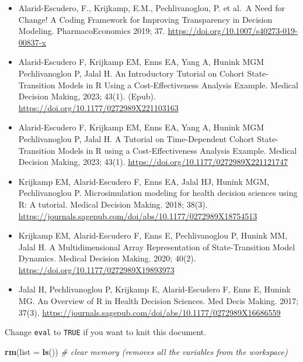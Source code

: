 \documentclass[
]{article}
\newenvironment{Shaded}{\begin{snugshade}}{\end{snugshade}}
\newcommand{\AttributeTok}[1]{\textcolor[rgb]{0.13,0.29,0.53}{#1}}
\newcommand{\CommentTok}[1]{\textcolor[rgb]{0.56,0.35,0.01}{\textit{#1}}}
\newcommand{\FunctionTok}[1]{\textcolor[rgb]{0.13,0.29,0.53}{\textbf{#1}}}
\newcommand{\NormalTok}[1]{#1}
\begin{document}
\begin{itemize}
\item
  Alarid-Escudero, F., Krijkamp, E.M., Pechlivanoglou, P. et al.~A Need
  for Change! A Coding Framework for Improving Transparency in Decision
  Modeling. PharmacoEconomics 2019; 37.
  \url{https://doi.org/10.1007/s40273-019-00837-x}
\item
  Alarid-Escudero F, Krijkamp EM, Enns EA, Yang A, Hunink MGM
  Pechlivanoglou P, Jalal H. An Introductory Tutorial on Cohort
  State-Transition Models in R Using a Cost-Effectiveness Analysis
  Example. Medical Decision Making, 2023; 43(1). (Epub).
  \url{https://doi.org/10.1177/0272989X221103163}
\item
  Alarid-Escudero F, Krijkamp EM, Enns EA, Yang A, Hunink MGM
  Pechlivanoglou P, Jalal H. A Tutorial on Time-Dependent Cohort
  State-Transition Models in R using a Cost-Effectiveness Analysis
  Example. Medical Decision Making, 2023; 43(1).
  \url{https://doi.org/10.1177/0272989X221121747}
\item
  Krijkamp EM, Alarid-Escudero F, Enns EA, Jalal HJ, Hunink MGM,
  Pechlivanoglou P. Microsimulation modeling for health decision
  sciences using R: A tutorial. Medical Decision Making. 2018; 38(3).
  \url{https://journals.sagepub.com/doi/abs/10.1177/0272989X18754513}
\item
  Krijkamp EM, Alarid-Escudero F, Enns E, Pechlivanoglou P, Hunink MM,
  Jalal H. A Multidimensional Array Representation of State-Transition
  Model Dynamics. Medical Decision Making. 2020; 40(2).
  \url{https://doi.org/10.1177/0272989X19893973}
\item
  Jalal H, Pechlivanoglou P, Krijkamp E, Alarid-Escudero F, Enns E,
  Hunink MG. An Overview of R in Health Decision Sciences. Med Decis
  Making. 2017; 37(3).
  \url{https://journals.sagepub.com/doi/abs/10.1177/0272989X16686559}
\end{itemize}

\newpage

Change \texttt{eval} to \texttt{TRUE} if you want to knit this document.

\begin{Shaded}
\begin{Highlighting}[]
\FunctionTok{rm}\NormalTok{(}\AttributeTok{list =} \FunctionTok{ls}\NormalTok{())      }\CommentTok{\# clear memory (removes all the variables from the workspace)}
\end{Highlighting}
\end{Shaded}
\end{document}

